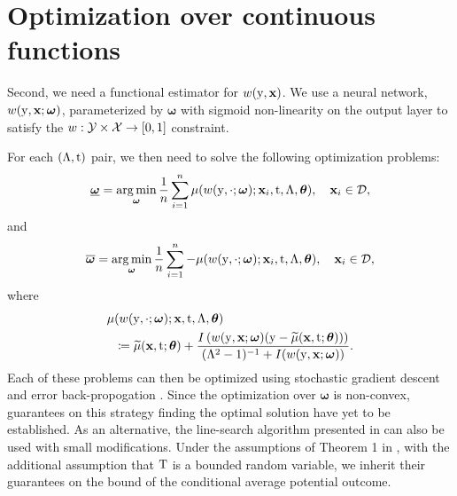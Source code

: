 \section{Optimization over continuous functions}
\label{app:gradient}

Second, we need a functional estimator for $w(\mathrm{y}, \mathbf{x})$. We use a neural network, $w(\mathrm{y}, \mathbf{x}; \bm{\omega})$, parameterized by $\bm{\omega}$ with sigmoid non-linearity on the output layer to satisfy the $w : \mathcal{Y}\times \mathcal{X} \to [0, 1]$ constraint.

For each $(\Lambda, \mathrm{t})$ pair, we then need to solve the following optimization problems:
\begin{equation*}
    \underline{\bm{\omega}} = \operatorname*{arg\,min}_{\bm{\omega}} \frac{1}{n} \sum_{i = 1}^{n} \mu(w(\mathrm{y}, \cdot; \bm{\omega}); \mathbf{x}_i, \mathrm{t}, \Lambda, \bm{\theta}), \quad \mathbf{x}_i \in \mathcal{D},
\end{equation*}
and
\begin{equation*}
    \overline{\bm{\omega}} = \operatorname*{arg\,min}_{\bm{\omega}} \frac{1}{n} \sum_{i = 1}^{n} -\mu(w(\mathrm{y}, \cdot; \bm{\omega}); \mathbf{x}_i, \mathrm{t}, \Lambda, \bm{\theta}), \quad \mathbf{x}_i \in \mathcal{D},
\end{equation*}
where
\begin{equation*}
    \begin{split}
        \mu&(w(\mathrm{y}, \cdot; \bm{\omega}); \mathbf{x}, \mathrm{t}, \Lambda, \bm{\theta}) \\
        &\coloneqq \widetilde{\mu}(\mathbf{x}, \mathrm{t}; \bm{\theta}) + \frac{I\left(w(\mathrm{y}, \mathbf{x}; \bm{\omega}) (\mathrm{y} - \widetilde{\mu}(\mathbf{x}, \mathrm{t}; \bm{\theta}))\right)}{(\Lambda^2 - 1)^{-1} + I(w(\mathrm{y}, \mathbf{x}; \bm{\omega}))}.
    \end{split}
\end{equation*}
Each of these problems can then be optimized using stochastic gradient descent \cite{ruder2016overview} and error back-propogation \cite{rumelhart1986learning}.
Since the optimization over $\bm{\omega}$ is non-convex, guarantees on this strategy finding the optimal solution have yet to be established. 
As an alternative, the line-search algorithm presented in \cite{jesson2021quantifying} can also be used with small modifications. 
Under the assumptions of Theorem 1 in \cite{jesson2021quantifying}, with the additional assumption that $\mathrm{T}$ is a bounded random variable, we inherit their guarantees on the bound of the conditional average potential outcome.

